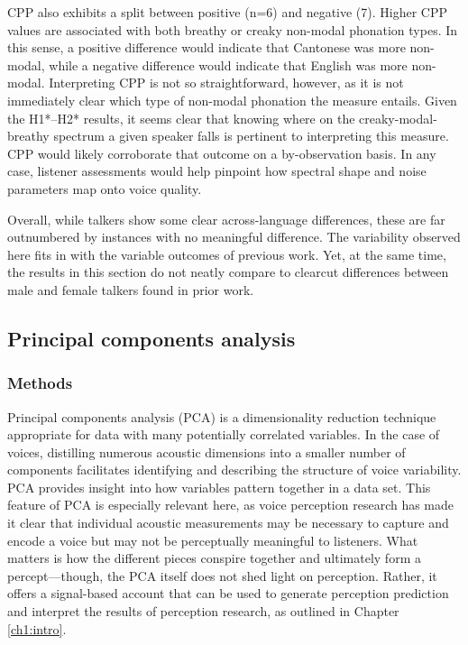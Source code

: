 CPP also exhibits a split between positive (n=6) and negative (7). Higher CPP values are associated with both breathy or creaky non-modal phonation types. In this sense, a positive difference would indicate that Cantonese was more non-modal, while a negative difference would indicate that English was more non-modal. Interpreting CPP is not so straightforward, however, as it is not immediately clear which type of non-modal phonation the measure entails. Given the H1*--H2* results, it seems clear that knowing where on the creaky-modal-breathy spectrum a given speaker falls is pertinent to interpreting this measure. CPP would likely corroborate that outcome on a by-observation basis. In any case, listener assessments would help pinpoint how spectral shape and noise parameters map onto voice quality.  

Overall, while talkers show some clear across-language differences, these are far outnumbered by instances with no meaningful difference. The variability observed here fits in with the variable outcomes of previous work. Yet, at the same time, the results in this section do not neatly compare to clearcut differences between male and female talkers found in prior work.

\subsection{Principal components analysis}\label{ch3:sec:pca}

\subsubsection{Methods}

Principal components analysis (PCA) is a dimensionality reduction technique appropriate for data with many potentially correlated variables. In the case of voices, distilling numerous acoustic dimensions into a smaller number of components facilitates identifying and describing the structure of voice variability. PCA provides insight into how variables pattern together in a data set. This feature of PCA is especially relevant here, as voice perception research has made it clear that individual acoustic measurements may be necessary to capture and encode a voice but may not be perceptually meaningful to listeners. What matters is how the different pieces conspire together and ultimately form a percept---though, the PCA itself does not shed light on perception. Rather, it offers a signal-based account that can be used to generate perception prediction and interpret the results of perception research, as outlined in Chapter \ref{ch1:intro}.

